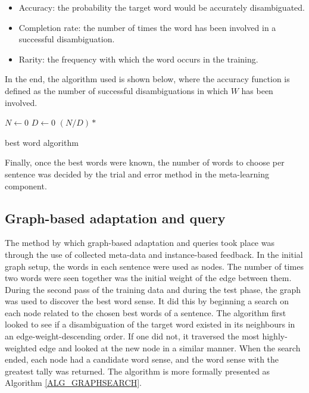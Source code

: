 \begin{itemize}
	\item Accuracy: the probability the target word would be accurately disambiguated.
	\item Completion rate: the number of times the word has been involved in a 
	successful disambiguation.  
	\item Rarity: the frequency with which the word occurs in the training.
\end{itemize}

In the end, the algorithm used is shown below, where the accuracy function is defined as the number of
successful disambiguations in which $W$ has been involved.

\IncMargin{1em}
\begin{algorithm}
\DontPrintSemicolon
{}
\BlankLine
	$N \longleftarrow 0$\;
	$D \longleftarrow 0$\;
	\Return $(N / D) *$ \;
\caption{best word algorithm \label{ALG_BESTWORDS}}
\end{algorithm}\DecMargin{1em}

Finally, once the best words were known, the number of words to choose per
sentence was decided by the trial and error method in the meta-learning component.

\subsection{Graph-based adaptation and query}

The method by which graph-based adaptation and queries took place was through the use of
collected meta-data and instance-based feedback.  In the initial graph
setup, the words in each sentence were used as nodes. The number of times two words 
were seen together was the initial weight of the edge between them. During the second pass 
of the training data and during the test phase, the graph was used to discover the best 
word sense. It did this by beginning a search on each node related to the chosen 
best words of a sentence. The algorithm first looked to see if a disambiguation 
of the target word existed in its neighbours in an edge-weight-descending order. 
If one did not, it traversed the most highly-weighted edge and looked at the new node 
in a similar manner.  When the search ended, each node had a candidate 
word sense, and the word sense with the greatest tally was returned. The algorithm is 
more formally presented as Algorithm \ref{ALG_GRAPHSEARCH}.


